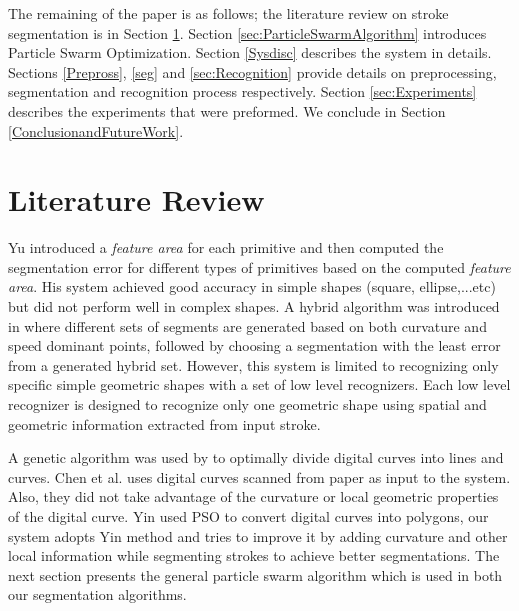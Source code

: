 \documentclass{article}
\begin{document}


 The remaining of the paper is as follows; the literature review on stroke segmentation is in Section \ref{sec:review}. Section \ref{sec:ParticleSwarmAlgorithm} introduces Particle Swarm Optimization. Section \ref{Sysdisc} describes the system in details.  Sections \ref{Prepross}, \ref{seg} and \ref{sec:Recognition} provide details on preprocessing, segmentation and recognition process respectively. Section \ref{sec:Experiments} describes the experiments that were preformed. We conclude in Section \ref{ConclusionandFutureWork}.  

\section{Literature Review}
\label{sec:review}

Yu \cite{meanshift10} introduced a \textit{feature area} for each primitive and then computed the segmentation error for different types of primitives based on the computed \textit{feature area}. His system achieved good accuracy in simple shapes (square, ellipse,...etc) but did not perform well in complex shapes. A hybrid algorithm was introduced in \cite{earlyprocess} where different sets of segments are generated based on both curvature and speed dominant points, followed by choosing a segmentation with the least error from a generated hybrid set. However, this system is limited to recognizing only specific simple geometric shapes with a set of low level recognizers. Each low level recognizer is designed to recognize only one geometric shape using spatial and geometric information extracted from input stroke. 

A genetic algorithm was used by \cite{CruveDivisionSwarm} to optimally divide digital curves into lines and curves. Chen et al. \cite{CruveDivisionSwarm} uses digital curves scanned from paper as input to the system. Also, they did not take advantage of the curvature or local geometric properties of the digital curve. Yin \cite{PolygonApproximationPSO} used PSO to convert digital curves into polygons, our system adopts  Yin \cite{PolygonApproximationPSO} method and tries to improve it by adding curvature and other local information while segmenting strokes to achieve better segmentations. The next section presents the general particle swarm algorithm which is used in both our segmentation algorithms.
\end{document}
